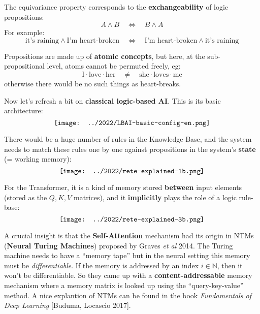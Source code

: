 \begin{preview}
\begin{minipage}{\textwidth}
The equivariance property corresponds to the \textbf{exchangeability} of logic propositions:
\begin{equation}
A \wedge B \quad \Leftrightarrow \quad B \wedge A
\end{equation}
For example:
\begin{equation}
\mbox{it's raining} \wedge \mbox{I'm heart-broken} \quad \Leftrightarrow \quad \mbox{I'm heart-broken} \wedge \mbox{it's raining}
\end{equation}

Propositions are made up of \textbf{atomic concepts}, but here, at the sub-propositional level, atoms cannot be permuted freely, eg:
\begin{equation}
\mbox{I} \cdot \mbox{love} \cdot \mbox{her} \quad \neq \quad \mbox{she} \cdot \mbox{loves} \cdot \mbox{me}
\end{equation}
otherwise there would be no such things as heart-breaks.

Now let's refresh a bit on \textbf{classical logic-based AI}.  This is its basic architecture:
\begin{equation}
\vcenter{\hbox{\texttt{[image: ../2022/LBAI-basic-config-en.png]}}}
\end{equation}

There would be a huge number of rules in the Knowledge Base, and the system needs to match these rules one by one against propositions in the system's \textbf{state} (= working memory):
\begin{equation}
\vcenter{\hbox{\texttt{[image: ../2022/rete-explained-1b.png]}}}
\end{equation}

For the Transformer, it is a kind of memory stored \textbf{between} input elements (stored as the $Q, K, V$ matrices), and it \textbf{implicitly} plays the role of a logic rule-base:
\begin{equation}
\label{fig:self-attention-as-Rete}
\vcenter{\hbox{\texttt{[image: ../2022/rete-explained-3b.png]}}}
\end{equation}

A crucial insight is that the \textbf{Self-Attention} mechanism had its origin in NTMs (\textbf{Neural Turing Machines}) proposed by Graves \textit{et al} 2014.  The Turing machine needs to have a ``memory tape'' but in the neural setting this memory must be \textit{differentiable}.  If the memory is addressed by an index $i \in \mathbb{N}$, then it won't be differentiable.  So they came up with a \textbf{content-addressable} memory mechanism where a memory matrix is looked up using the ``query-key-value'' method.  A nice explantion of NTMs can be found in the book \textit{Fundamentals of Deep Learning} [Buduma, Locascio 2017].


\end{minipage}
\end{preview}
